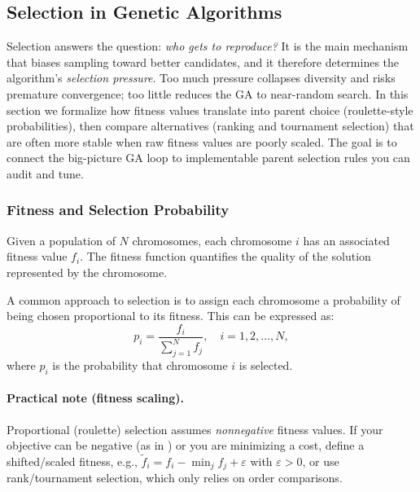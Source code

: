 
\subsection{Selection in Genetic Algorithms}
\label{sec:evo_selection_in_genetic_algorithms}

Selection answers the question: \emph{who gets to reproduce?} It is the main mechanism that biases sampling
toward better candidates, and it therefore determines the algorithm's \emph{selection pressure}. Too much
pressure collapses diversity and risks premature convergence; too little reduces the GA to near-random
search. In this section we formalize how fitness values translate into parent choice (roulette-style
probabilities), then compare alternatives (ranking and tournament selection) that are often more stable when
raw fitness values are poorly scaled. The goal is to connect the big-picture GA loop to implementable parent
selection rules you can audit and tune.

\subsubsection{Fitness and Selection Probability}
\label{sec:evo_fitness_and_selection_probability_sub}

Given a population of $N$ chromosomes, each chromosome $i$ has an associated fitness value $f_i$. The fitness function quantifies the quality of the solution represented by the chromosome.

A common approach to selection is to assign each chromosome a probability of being chosen proportional to its fitness. This can be expressed as:
\begin{equation}
    p_i = \frac{f_i}{\sum_{j=1}^N f_j}, \quad i=1,2,\ldots, N,
    \label{eq:selection_probability}
\end{equation}
where $p_i$ is the probability that chromosome $i$ is selected.

\paragraph{Practical note (fitness scaling).}
Proportional (roulette) selection assumes \emph{nonnegative} fitness values. If your objective can be negative (as in ) or you are minimizing a cost, define a shifted/scaled fitness, e.g.,
\(\tilde f_i = f_i - \min_j f_j + \varepsilon\) with \(\varepsilon>0\), or use rank/tournament selection, which only relies on order comparisons.

